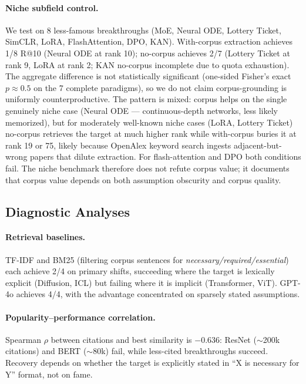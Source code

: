 \documentclass[11pt]{article}
\begin{document}
\paragraph{Niche subfield control.}
We test on 8 less-famous breakthroughs (MoE, Neural ODE, Lottery Ticket, SimCLR, LoRA, FlashAttention, DPO, KAN). With-corpus extraction achieves 1/8 R@10 (Neural ODE at rank 10); no-corpus achieves 2/7 (Lottery Ticket at rank 9, LoRA at rank 2; KAN no-corpus incomplete due to quota exhaustion). The aggregate difference is not statistically significant (one-sided Fisher's exact $p \approx 0.5$ on the 7 complete paradigms), so we do not claim corpus-grounding is uniformly counterproductive. The pattern is mixed: corpus helps on the single genuinely niche case (Neural ODE --- continuous-depth networks, less likely memorized), but for moderately well-known niche cases (LoRA, Lottery Ticket) no-corpus retrieves the target at much higher rank while with-corpus buries it at rank 19 or 75, likely because OpenAlex keyword search ingests adjacent-but-wrong papers that dilute extraction. For flash-attention and DPO both conditions fail. The niche benchmark therefore does not refute corpus value; it documents that corpus value depends on both assumption obscurity and corpus quality.

\subsection{Diagnostic Analyses}\label{sec:diagnostics}

\paragraph{Retrieval baselines.}
TF-IDF and BM25 (filtering corpus sentences for \emph{necessary/required/essential}) each achieve 2/4 on primary shifts, succeeding where the target is lexically explicit (Diffusion, ICL) but failing where it is implicit (Transformer, ViT). GPT-4o achieves 4/4, with the advantage concentrated on sparsely stated assumptions.

\paragraph{Popularity--performance correlation.}
Spearman $\rho$ between citations and best similarity is $-0.636$: ResNet ($\sim$200k citations) and BERT ($\sim$80k) fail, while less-cited breakthroughs succeed. Recovery depends on whether the target is explicitly stated in ``X is necessary for Y'' format, not on fame.
\end{document}
